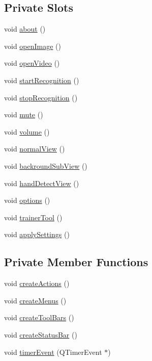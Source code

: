 \subsection*{Private Slots}
\begin{DoxyCompactItemize}
\item 
void \hyperlink{classMainWindow_a7be6a5d98970ac1a6296c6f9aee1e9bb}{about} ()
\item 
void \hyperlink{classMainWindow_ab036b89cc10ef5d41ee92df1ce243ba0}{openImage} ()
\item 
void \hyperlink{classMainWindow_a522431183b98bcfd052e9fc1a59d6d68}{openVideo} ()
\item 
void \hyperlink{classMainWindow_ac6730e1b5d17d777746e3cc8e62dff49}{startRecognition} ()
\item 
void \hyperlink{classMainWindow_aa47167647627b38fcac3ce61542caf68}{stopRecognition} ()
\item 
void \hyperlink{classMainWindow_acbad2650aa1ea48af4d5b434775615bf}{mute} ()
\item 
void \hyperlink{classMainWindow_a9c091ffb4ff09266707ba8f7c808fd95}{volume} ()
\item 
void \hyperlink{classMainWindow_ac06dc02bfa81799a432ee57597f0a5b4}{normalView} ()
\item 
void \hyperlink{classMainWindow_aa41d4e806ac8e8eca3c7c768276d9990}{backroundSubView} ()
\item 
void \hyperlink{classMainWindow_ae51982f5f1fd69637449af156830a5d8}{handDetectView} ()
\item 
void \hyperlink{classMainWindow_afd01705e68779121c241b53e8fe69055}{options} ()
\item 
void \hyperlink{classMainWindow_a432ec274d719660e4f772106d2bf320d}{trainerTool} ()
\item 
void \hyperlink{classMainWindow_a5d35402881e369e364eab5c647478f5d}{applySettings} ()
\end{DoxyCompactItemize}
\subsection*{Private Member Functions}
\begin{DoxyCompactItemize}
\item 
void \hyperlink{classMainWindow_a62cd8712fb41a754298f6f60eead2cb0}{createActions} ()
\item 
void \hyperlink{classMainWindow_aa4907b0251d305659e403c62921ef331}{createMenus} ()
\item 
void \hyperlink{classMainWindow_acce4e32b95d3d5cb48470c053a1740c2}{createToolBars} ()
\item 
void \hyperlink{classMainWindow_af0a8a3f54a87bd7ad6f23248dd0e9c09}{createStatusBar} ()
\item 
void \hyperlink{classMainWindow_a1c7877c1ca466bd8034d88762ce2af9f}{timerEvent} (QTimerEvent $\ast$)
\end{DoxyCompactItemize}
